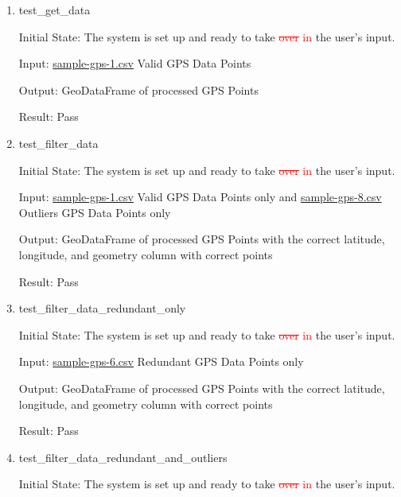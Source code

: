 \documentclass[12pt, titlepage]{article}
\begin{document}
\begin{enumerate}
    \item{test\_get\_data} \label{test_get_data}
    
    Initial State: The system is set up and ready to take \textcolor{red}{\sout{over} in} the user’s input.

    Input: \href{https://github.com/paezha/PyERT-BLACK/blob/rev0-test/quarto-example/data/sample-gps/sample-gps-1.csv}{sample-gps-1.csv} Valid GPS Data Points
    
    Output: GeoDataFrame of processed GPS Points 
    
    Result: Pass



    \item{test\_filter\_data} \label{test_filter_data}
    
    Initial State: The system is set up and ready to take \textcolor{red}{\sout{over} in} the user’s input.

    Input: \href{https://github.com/paezha/PyERT-BLACK/blob/rev0-test/quarto-example/data/sample-gps/sample-gps-1.csv}{sample-gps-1.csv} Valid GPS Data Points only and \href{https://github.com/paezha/PyERT-BLACK/blob/rev0-test/quarto-example/data/sample-gps/sample-gps-8.csv}{sample-gps-8.csv} Outliers GPS Data Points only
    
    Output: GeoDataFrame of processed GPS Points with the correct latitude, longitude, and geometry column with correct points
    
    Result: Pass

    \item{test\_filter\_data\_redundant\_only} \label{test_filter_data_redundant_only}
    
    Initial State: The system is set up and ready to take \textcolor{red}{\sout{over} in} the user’s input.

    Input: \href{https://github.com/paezha/PyERT-BLACK/blob/rev0-test/quarto-example/data/sample-gps/sample-gps-6.csv}{sample-gps-6.csv} Redundant GPS Data Points only
    
    Output: GeoDataFrame of processed GPS Points with the correct latitude, longitude, and geometry column with correct points
    
    Result: Pass

    \item{test\_filter\_data\_redundant\_and\_outliers} \label{test_filter_data_redundant_and_outliers}
    
    Initial State: The system is set up and ready to take \textcolor{red}{\sout{over} in} the user’s input.


\end{enumerate}
\end{document}
